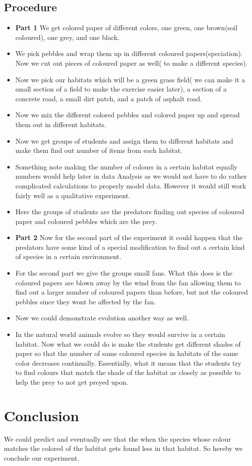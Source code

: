\documentclass{scrartcl}
\begin{document}
\subsection{Procedure}
\begin{itemize}
    \item \textbf{Part 1} We get colored paper of different colors, one green, one brown(soil coloured), one grey, and one black.
    \item We pick pebbles and wrap them up in different coloured papers(speciation). Now we cut out pieces of coloured paper as well( to make a different species).

    \item Now we pick our habitats which will be a green grass field( we can make it a small section of a field to make the exercise easier later), a section of a concrete road, a small dirt patch, and a patch of asphalt road.
    \item Now we mix the different colored pebbles and colored paper up and spread them out in different habitats.
    \item Now we get groups of students and assign them to different habitats and make them find out number of items from each habitat.
    \item Something note making the number of colours in a certain habitat equally numbers would help later in data Analysis as we would not have to do rather complicated calculations to properly model data. However it would still work fairly well as a qualitative experiment.
    \item Here the groups of students are the predators finding out species of coloured paper and coloured pebbles which are the prey. 
    \item \textbf{Part 2} Now for the second part of the experiment it could happen that the predators have some kind of a special modification to find out a certain kind of species in a certain environment. 
    \item For the second part we give the groups small fans. What this does is the coloured papers are blown away by the wind from the fan allowing them to find out a larger number of coloured papers than before, but not the coloured pebbles since they wont be affected by the fan.
    \item Now we could demonstrate evolution another way as well.
    \item In the natural world animals evolve so they would survive in a certain habitat. Now what we could do is make the students get different shades of paper so that the number of same coloured species in habitats of the same color decreases continually. Essentially, what it means that the students try to find colours that match the shade of the habitat as closely as possible to help the prey to not get preyed upon.
\end{itemize}

\section{Conclusion}
 We could predict and eventually see that the when the species whose colour matches the colored of the habitat gets found less in that habitat. So hereby we conclude our experiment.
\end{document}
